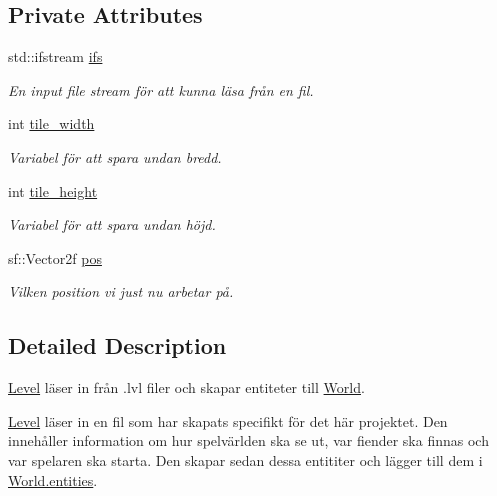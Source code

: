 \subsection*{Private Attributes}
\begin{DoxyCompactItemize}
\item 
std\+::ifstream \hyperlink{classLevel_aa1a8e3b1ba0606c3c461624b5af8172c}{ifs}
\begin{DoxyCompactList}\small\item\em En input file stream för att kunna läsa från en fil. \end{DoxyCompactList}\item 
int \hyperlink{classLevel_ac846cb2f8b1bd0f92a60a484ce1e50ef}{tile\+\_\+width}
\begin{DoxyCompactList}\small\item\em Variabel för att spara undan bredd. \end{DoxyCompactList}\item 
int \hyperlink{classLevel_a75ae0539332f57c52edac380fa0fc0c3}{tile\+\_\+height}
\begin{DoxyCompactList}\small\item\em Variabel för att spara undan höjd. \end{DoxyCompactList}\item 
sf\+::\+Vector2f \hyperlink{classLevel_a23a51431287bd8692a998de1b1fdf884}{pos}
\begin{DoxyCompactList}\small\item\em Vilken position vi just nu arbetar på. \end{DoxyCompactList}\end{DoxyCompactItemize}


\subsection{Detailed Description}
\hyperlink{classLevel}{Level} läser in från .lvl filer och skapar entiteter till \hyperlink{classWorld}{World}. 

\hyperlink{classLevel}{Level} läser in en fil som har skapats specifikt för det här projektet. Den innehåller information om hur spelvärlden ska se ut, var fiender ska finnas och var spelaren ska starta. Den skapar sedan dessa entititer och lägger till dem i \hyperlink{classWorld_a74d706a3a47afe52b70f5e2dd3bf612b}{World.\+entities}. 

